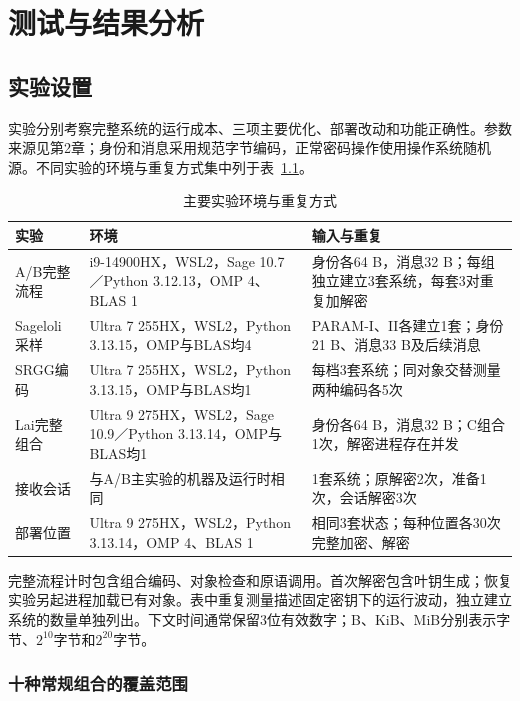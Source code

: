 \chapter{测试与结果分析}

\section{实验设置}
实验分别考察完整系统的运行成本、三项主要优化、部署改动和功能正确性。参数来源见第2章；身份和消息采用规范字节编码，正常密码操作使用操作系统随机源。不同实验的环境与重复方式集中列于表~\ref{tab:environments}。

\begin{table}[H]
\centering\small
\caption{主要实验环境与重复方式}
\label{tab:environments}
\begin{tabularx}{\textwidth}{@{}p{}Xp{}@{}}
\toprule
\rowcolor{black!8} 实验 & 环境 & 输入与重复 \\
\midrule
A/B完整流程 & i9-14900HX，WSL2，Sage 10.7／Python 3.12.13，OMP 4、BLAS 1 & 身份各64 B，消息32 B；每组独立建立3套系统，每套3对重复加解密 \\
Sageloli采样 & Ultra 7 255HX，WSL2，Python 3.13.15，OMP与BLAS均4 & PARAM-I、II各建立1套；身份21 B、消息33 B及后续消息 \\
SRGG编码 & Ultra 7 255HX，WSL2，Python 3.13.15，OMP与BLAS均1 & 每档3套系统；同对象交替测量两种编码各5次 \\
Lai完整组合 & Ultra 9 275HX，WSL2，Sage 10.9／Python 3.13.14，OMP与BLAS均1 & 身份各64 B，消息32 B；C组合1次，解密进程存在并发 \\
接收会话 & 与A/B主实验的机器及运行时相同 & 1套系统；原解密2次，准备1次，会话解密3次 \\
部署位置 & Ultra 9 275HX，WSL2，Python 3.13.14，OMP 4、BLAS 1 & 相同3套状态；每种位置各30次完整加密、解密 \\
\bottomrule
\end{tabularx}
\end{table}

完整流程计时包含组合编码、对象检查和原语调用。首次解密包含叶钥生成；恢复实验另起进程加载已有对象。表中重复测量描述固定密钥下的运行波动，独立建立系统的数量单独列出。下文时间通常保留3位有效数字；B、KiB、MiB分别表示字节、$2^{10}$字节和$2^{20}$字节。

\subsection{十种常规组合的覆盖范围}

